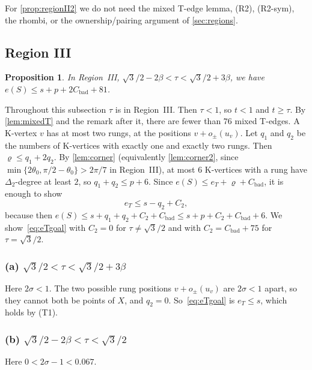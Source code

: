 \documentclass[11pt]{amsart}
\newtheorem{proposition}[theorem]{Proposition}
\theoremstyle{definition}
\theoremstyle{remark}
\newcommand{\Dt}{\Delta_2}
\begin{document}
For \cref{prop:regionII2} we do not need the mixed T-edge lemma, (R2), (R2-sym), the rhombi, or the ownership/pairing argument of \cref{sec:regions}.

\subsection{Region III}

\begin{proposition}\label{prop:regionIII2}
In Region~III, $\sqrt3/2-2\beta<\tau<\sqrt3/2+3\beta$, we have $e(S)\le s+p+2C_{\mathrm{bad}}+81$.
\end{proposition}

Throughout this subsection $\tau$ is in Region~III. Then $\tau<1$, so $t<1$ and $t\ge\tau$. By \cref{lem:mixedT} and the remark after it, there are fewer than $76$ mixed T-edges. A K-vertex $v$ has at most two rungs, at the positions $v+o_\pm(u_v)$. Let $q_1$ and $q_2$ be the numbers of K-vertices with exactly one and exactly two rungs. Then $\varrho\le q_1+2q_2$. By \cref{lem:corner} (equivalently \cref{lem:corner2}, since $\min\{2\theta_0,\pi/2-\theta_0\}>2\pi/7$ in Region~III), at most $6$ K-vertices with a rung have $\Dt$-degree at least $2$, so $q_1+q_2\le p+6$. Since $e(S)\le e_T+\varrho+C_{\mathrm{bad}}$, it is enough to show
\begin{equation}\label{eq:eTgoal}
e_T\le s-q_2+C_2,
\end{equation}
because then $e(S)\le s+q_1+q_2+C_2+C_{\mathrm{bad}}\le s+p+C_2+C_{\mathrm{bad}}+6$. We show~\eqref{eq:eTgoal} with $C_2=0$ for $\tau\ne\sqrt3/2$ and with $C_2=C_{\mathrm{bad}}+75$ for $\tau=\sqrt3/2$.

\subsubsection*{(a) $\sqrt3/2<\tau<\sqrt3/2+3\beta$}
Here $2\sigma<1$. The two possible rung positions $v+o_\pm(u_v)$ are $2\sigma<1$ apart, so they cannot both be points of $X$, and $q_2=0$. So~\eqref{eq:eTgoal} is $e_T\le s$, which holds by (T1).

\subsubsection*{(b) $\sqrt3/2-2\beta<\tau<\sqrt3/2$}
Here $0<2\sigma-1<0.067$.
\end{document}
